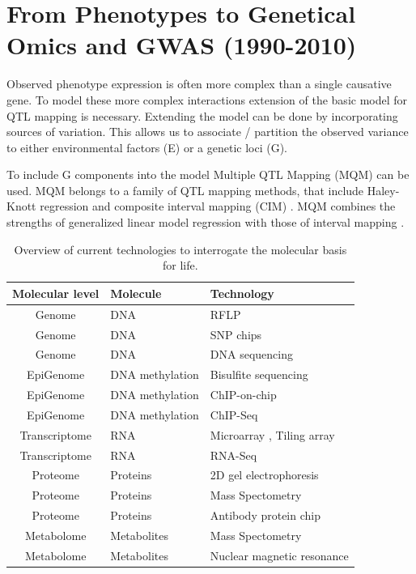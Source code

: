 \section{From Phenotypes to Genetical Omics and GWAS (1990-2010)}

Observed phenotype expression is often more complex than a single causative gene. 
To model these more complex interactions extension of the basic model for QTL mapping is 
necessary. Extending the model can be done by incorporating sources of variation. This allows 
us to associate / partition the observed variance to either environmental factors (E) or a 
genetic loci (G).

To include G components into the model Multiple QTL Mapping (MQM) can be used. MQM belongs 
to a family of QTL mapping methods, that include Haley-Knott regression \cite{Haley:1992} 
and composite interval mapping (CIM) \cite{Zeng:1994}. MQM combines the strengths of 
generalized linear model regression with those of interval mapping \cite{Jansen:1993, Jansen:1994b}. 

\begin{table}[h]
  \centering
  {\footnotesize
  \begin{tabular}{ | c | l | l | }
    \hline
    {\bf Molecular level} & {\bf Molecule} & {\bf Technology}\\
    \hline
    \hline
\rowcolor{gray!35}    Genome          & DNA                & RFLP \cite{Lander:1986} \\
\rowcolor{gray!35}    Genome          & DNA                & SNP chips \cite{Hacia:1999} \\
\rowcolor{gray!35}    Genome          & DNA                & DNA sequencing \cite{Mardis:2008} \\
    \hline
    EpiGenome       & DNA methylation    & Bisulfite sequencing \cite{Hayatsu:2007} \\
    EpiGenome       & DNA methylation    & ChIP-on-chip \cite{Collas:2010} \\
    EpiGenome       & DNA methylation    & ChIP-Seq \cite{Park:2009} \\
    \hline
    \hline
\rowcolor{gray!35}    Transcriptome   & RNA          & Microarray \cite{Lashkari:1997}, Tiling array \cite{Lee:2013} \\
\rowcolor{gray!35}    Transcriptome   & RNA          & RNA-Seq \cite{Wang:2009}\\
    \hline
    Proteome        & Proteins     & 2D gel electrophoresis \cite{O'Farrell:1975}\\
    Proteome        & Proteins     & Mass Spectometry \cite{Deshaies:2001}\\
    Proteome        & Proteins     & Antibody protein chip \cite{Fasolo:2009} \\
    \hline
\rowcolor{gray!35}    Metabolome      & Metabolites  & Mass Spectometry \cite{Aebersold:2003} \\
\rowcolor{gray!35}    Metabolome      & Metabolites  & Nuclear magnetic resonance \cite{Espina:2009} \\
    \hline
  \end{tabular}
  }
  \caption[Overview]{Overview of current technologies to interrogate the molecular basis for life.}
\end{table}

